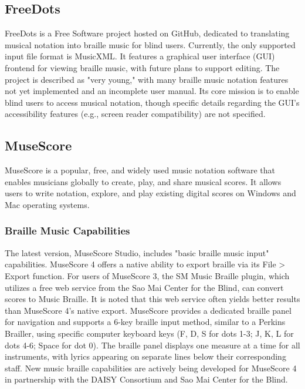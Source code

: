 \subsection{FreeDots}
FreeDots is a Free Software project hosted on GitHub, dedicated to translating musical notation into braille music for blind users. \cite{blindguru-freedots} Currently, the only supported input file format is MusicXML. \cite{blindguru-freedots} It features a graphical user interface (GUI) frontend for viewing braille music, with future plans to support editing. \cite{blindguru-freedots} The project is described as "very young," with many braille music notation features not yet implemented and an incomplete user manual. \cite{blindguru-freedots} Its core mission is to enable blind users to access musical notation, \cite{blindguru-freedots} though specific details regarding the GUI's accessibility features (e.g., screen reader compatibility) are not specified. \cite{blindguru-freedots}

\subsection{MuseScore}
MuseScore is a popular, free, and widely used music notation software that enables musicians globally to create, play, and share musical scores. \cite{soundwithoutsight-musescore, musescore-braille} It allows users to write notation, explore, and play existing digital scores on Windows and Mac operating systems. \cite{soundwithoutsight-musescore}

\subsubsection{Braille Music Capabilities}
The latest version, MuseScore Studio, includes "basic braille music input" capabilities. \cite{soundwithoutsight-musescore} MuseScore 4 offers a native ability to export braille via its File > Export function. \cite{musescore-accessibility} For users of MuseScore 3, the SM Music Braille plugin, which utilizes a free web service from the Sao Mai Center for the Blind, can convert scores to Music Braille. It is noted that this web service often yields better results than MuseScore 4's native export. \cite{musescore-accessibility} MuseScore provides a dedicated braille panel for navigation and supports a 6-key braille input method, similar to a Perkins Brailler, using specific computer keyboard keys (F, D, S for dots 1-3; J, K, L for dots 4-6; Space for dot 0). \cite{musescore-braille} The braille panel displays one measure at a time for all instruments, with lyrics appearing on separate lines below their corresponding staff. \cite{musescore-braille} New music braille capabilities are actively being developed for MuseScore 4 in partnership with the DAISY Consortium and Sao Mai Center for the Blind. \cite{daisy-musicxml}

